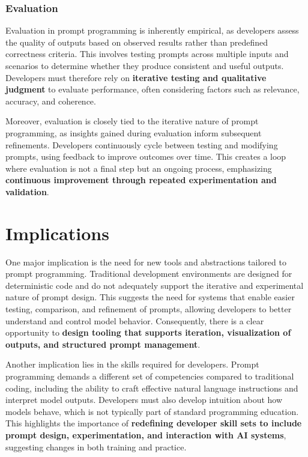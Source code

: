\subsubsection{Evaluation}
Evaluation in prompt programming is inherently empirical, as developers assess the quality of outputs based on observed results rather than predefined correctness criteria. This involves testing prompts across multiple inputs and scenarios to determine whether they produce consistent and useful outputs. Developers must therefore rely on \textbf{iterative testing and qualitative judgment} to evaluate performance, often considering factors such as relevance, accuracy, and coherence.

Moreover, evaluation is closely tied to the iterative nature of prompt programming, as insights gained during evaluation inform subsequent refinements. Developers continuously cycle between testing and modifying prompts, using feedback to improve outcomes over time. This creates a loop where evaluation is not a final step but an ongoing process, emphasizing \textbf{continuous improvement through repeated experimentation and validation}.

\section{Implications}
One major implication is the need for new tools and abstractions tailored to prompt programming. Traditional development environments are designed for deterministic code and do not adequately support the iterative and experimental nature of prompt design. This suggests the need for systems that enable easier testing, comparison, and refinement of prompts, allowing developers to better understand and control model behavior. Consequently, there is a clear opportunity to \textbf{design tooling that supports iteration, visualization of outputs, and structured prompt management}.

Another implication lies in the skills required for developers. Prompt programming demands a different set of competencies compared to traditional coding, including the ability to craft effective natural language instructions and interpret model outputs. Developers must also develop intuition about how models behave, which is not typically part of standard programming education. This highlights the importance of \textbf{redefining developer skill sets to include prompt design, experimentation, and interaction with AI systems}, suggesting changes in both training and practice.

